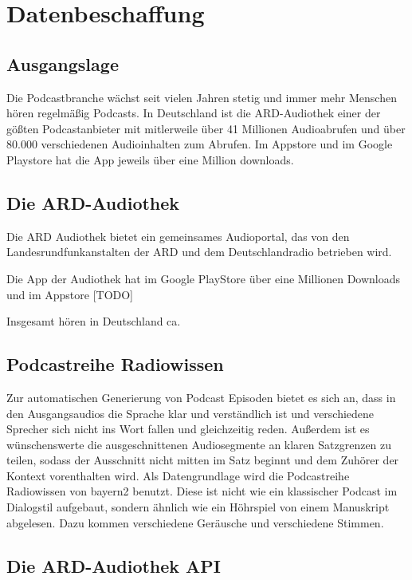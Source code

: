 \chapter{Datenbeschaffung}\label{ch:data}

\section{Ausgangslage}
 
Die Podcastbranche wächst seit vielen Jahren stetig und immer mehr Menschen hören regelmäßig Podcasts.
In Deutschland ist die ARD-Audiothek einer der gößten Podcastanbieter mit mitlerweile über 41 Millionen Audioabrufen und über 80.000 verschiedenen Audioinhalten zum Abrufen. 
Im Appstore und im Google Playstore hat die App jeweils über eine Million downloads.
\cite{gotting2023}




\section{Die ARD-Audiothek}

Die ARD Audiothek bietet ein gemeinsames Audioportal, das von den Landesrundfunkanstalten der ARD und dem Deutschlandradio betrieben wird.

Die App der Audiothek hat im Google PlayStore über eine Millionen Downloads und im Appstore [TODO]

Insgesamt hören in Deutschland ca. 

\section{Podcastreihe Radiowissen}

Zur automatischen Generierung von Podcast Episoden bietet es sich an, dass in den Ausgangsaudios die Sprache klar und verständlich ist und verschiedene Sprecher sich nicht ins Wort fallen und gleichzeitig reden.
Außerdem ist es wünschenswerte die ausgeschnittenen Audiosegmente an klaren Satzgrenzen zu teilen, sodass der Ausschnitt nicht mitten im Satz beginnt und dem Zuhörer der Kontext vorenthalten wird. 
Als Datengrundlage wird die Podcastreihe Radiowissen von bayern2 benutzt. 
Diese ist nicht wie ein klassischer Podcast im Dialogstil aufgebaut, sondern ähnlich wie ein Höhrspiel von einem Manuskript abgelesen.
Dazu kommen verschiedene Geräusche und verschiedene Stimmen.



\section{Die ARD-Audiothek API}

